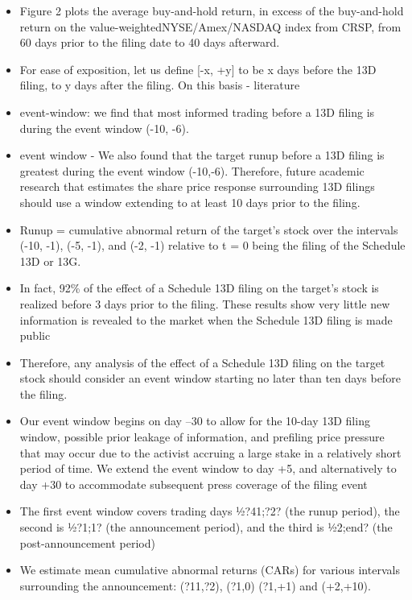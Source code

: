 \documentclass[12pt]{article}
\begin{document}
    \begin{itemize}

        \item Figure 2 plots the average buy-and-hold return, in excess of the buy-and-hold return on the value-weightedNYSE/Amex/NASDAQ index from CRSP, from 60 days prior to the filing date to 40 days afterward.\citep{Collin-Dufresne2015}

        \item For ease of exposition, let us define [-x, +y] to be x days before the 13D filing, to y days after the filing. On this basis - literature \citep{CoffeeJr.2014}

        \item event-window: we find that most informed trading before a 13D filing is during the event window (-10, -6).\citep{Brigida2012}


        \item event window - We also found that the target runup before a 13D filing is greatest during the event window (-10,-6). Therefore, future academic research that estimates the share price response surrounding 13D filings should use a window extending to at least 10 days prior to the filing. \citep{Brigida2012}

        \item Runup = cumulative abnormal return of the target’s stock over the intervals (-10, -1), (-5, -1), and (-2, -1) relative to t = 0 being the filing of the Schedule 13D or 13G. \citep{Brigida2012}
        
        \item In fact, 92\% of the effect of a Schedule 13D filing on the target’s stock is realized before 3 days prior to the filing. These results show very little new information is revealed to the market when the Schedule 13D filing is made public \citep{Brigida2012}

        \item Therefore, any analysis of the effect of a Schedule 13D filing on the target stock should consider an event window starting no later than ten days before the filing. \citep{Brigida2012}

        \item Our event window begins on day –30 to allow for the 10-day 13D filing window, possible prior leakage of information, and prefiling price pressure that may occur due to the activist accruing a large stake in a relatively short period of time. We extend the event window to day +5, and alternatively to day +30 to accommodate subsequent press coverage of the filing event \citep{Klein2009}

        \item The first event window covers trading days ½?41;?2? (the runup period), the second is ½?1;1? (the announcement period), and the third is ½2;end? (the post-announcement period) \citep{Betton2009}

        \item We estimate mean cumulative abnormal returns (CARs) for various intervals surrounding the announcement: (?11,?2), (?1,0) (?1,+1) and (+2,+10). \citep{Akhigbe2007}
    \end{itemize}
\end{document}
